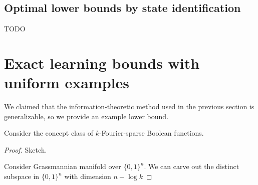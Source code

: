 \documentclass[main.tex]{subfiles}
\begin{document}
\subsection{Optimal lower bounds by state identification}

TODO

\section{Exact learning bounds with uniform examples}

We claimed that the information-theoretic method used in the previous section is generalizable, so we provide an example lower bound.

Consider the concept class of $k$-Fourier-sparse Boolean functions.

\begin{proof}
Sketch.

Consider Grassmannian manifold over $\{0, 1\}^n$. We can carve out the distinct subspace in $\{0, 1\}^n$ with dimension $n - \log k$	
\end{proof}


%
%
%
%	
%
%
%
\end{document}
